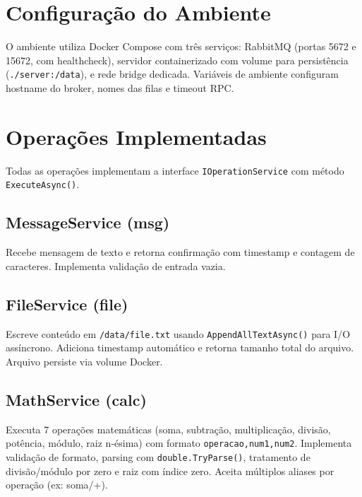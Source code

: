 \documentclass[12pt,a4paper]{article}
\begin{document}
\section{Configuração do Ambiente}

O ambiente utiliza Docker Compose com três serviços: RabbitMQ (portas 5672 e 15672, com healthcheck), servidor containerizado com volume para persistência (\texttt{./server:/data}), e rede bridge dedicada. Variáveis de ambiente configuram hostname do broker, nomes das filas e timeout RPC.

\section{Operações Implementadas}

Todas as operações implementam a interface \texttt{IOperationService} com método \texttt{ExecuteAsync()}.

\subsection{MessageService (msg)}
Recebe mensagem de texto e retorna confirmação com timestamp e contagem de caracteres. Implementa validação de entrada vazia.

\subsection{FileService (file)}
Escreve conteúdo em \texttt{/data/file.txt} usando \texttt{AppendAllTextAsync()} para I/O assíncrono. Adiciona timestamp automático e retorna tamanho total do arquivo. Arquivo persiste via volume Docker.

\subsection{MathService (calc)}
Executa 7 operações matemáticas (soma, subtração, multiplicação, divisão, potência, módulo, raiz n-ésima) com formato \texttt{operacao,num1,num2}. Implementa validação de formato, parsing com \texttt{double.TryParse()}, tratamento de divisão/módulo por zero e raiz com índice zero. Aceita múltiplos aliases por operação (ex: soma/+).
\end{document}

